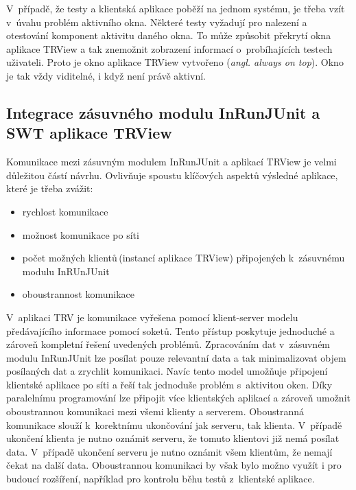     \noindent
    V~případě, že testy a klientská aplikace poběží na jednom systému, je třeba vzít v~úvahu problém aktivního okna. Některé testy vyžadují pro nalezení a otestování komponent aktivitu daného okna. To může způsobit překrytí okna aplikace TRView a tak znemožnit zobrazení informací o~probíhajících testech uživateli. Proto je okno aplikace TRView vytvořeno (\emph{angl. always on top}). Okno je tak vždy viditelné, i když není právě aktivní.

    \subsection{Integrace zásuvného modulu InRunJUnit a SWT aplikace TRView}
    Komunikace mezi zásuvným modulem InRunJUnit a aplikací TRView je velmi důležitou částí návrhu. Ovlivňuje spoustu klíčových aspektů výsledné aplikace, které je třeba zvážit:
    \begin{itemize}
     \item rychlost komunikace
     \item možnost komunikace po síti
     \item počet možných klientů\,(instancí aplikace TRView) připojených k~zásuvnému modulu InRUnJUnit
     \item oboustrannost komunikace
    \end{itemize}
    
    \noindent
    V~aplikaci TRV je komunikace vyřešena pomocí klient-server modelu předávajícího informace pomocí soketů. Tento přístup poskytuje jednoduché a zároveň kompletní řešení uvedených problémů. Zpracováním dat v~zásuvném modulu InRunJUnit lze posílat pouze relevantní data a tak minimalizovat objem posílaných dat a zrychlit komunikaci. Navíc tento model umožňuje připojení klientské aplikace po síti a řeší tak jednoduše problém s~aktivitou oken. Díky paralelnímu programování lze připojit více klientských aplikací a zároveň umožnit oboustrannou komunikaci mezi všemi klienty a serverem. Oboustranná komunikace slouží k~korektnímu ukončování jak serveru, tak klienta. V~případě ukončení klienta je nutno oznámit serveru, že tomuto klientovi již nemá posílat data. V~případě ukončení serveru je nutno oznámit všem klientům, že nemají čekat na další data. Oboustrannou komunikaci by však bylo možno využít i pro budoucí rozšíření, například pro kontrolu běhu testů z~klientské aplikace.
    
